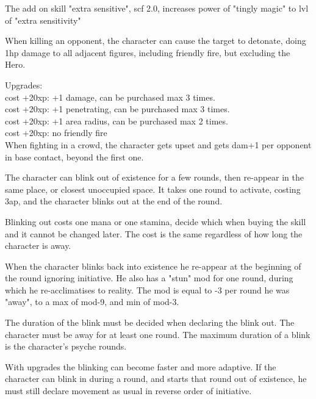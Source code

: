 The add on skill "extra sensitive", scf 2.0, increases power of "tingly magic" to lvl of "extra sensitivity"


 When killing an opponent, the character can cause the target to detonate, doing 1hp damage to all adjacent figures, including friendly fire, but excluding the Hero.

Upgrades:\\
cost +20xp: +1 damage, can be purchased max 3 times. \\
cost +20xp: +1 penetrating, can be purchased max 3 times. \\
cost +20xp: +1 area radius, can be purchased max 2 times. \\
cost +20xp: no friendly fire \\


 When fighting in a crowd, the character gets upset and gets dam+1 per opponent in base contact, beyond the first one.


 The character can blink out of existence for a few rounds, then re-appear in the same place, or closest unoccupied space. It takes one round to activate, costing 3ap, and the character blinks out at the end of the round.

Blinking out costs one mana or one stamina, decide which when buying the skill and it cannot be changed later. The cost is the same regardless of how long the character is away.

When the character blinks back into existence he re-appear at the beginning of the round ignoring initiative. He also has a "stun" mod for one round, during which he re-acclimatises to reality. The mod is equal to -3 per round he was "away", to a max of mod-9, and min of mod-3.

The duration of the blink must be decided when declaring the blink out.
The character must be away for at least one round. The maximum duration of a blink is the character's psyche rounds.

With upgrades the blinking can become faster and more adaptive. If the character can blink in during a round, and starts that round out of existence, he must still declare movement as usual in reverse order of initiative.

